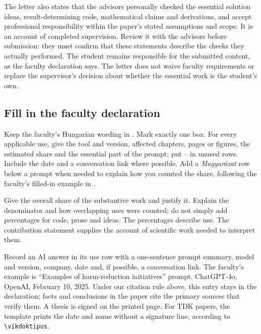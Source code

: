 The letter also states that the advisors personally checked the essential solution ideas, result-determining code, mathematical claims and derivations, and accept professional responsibility within the paper's stated assumptions and scope. It is an account of completed supervision. Review it with the advisors before submission: they must confirm that these statements describe the checks they actually performed. The student remains responsible for the submitted content, as the faculty declaration says. The letter does not waive faculty requirements or replace the supervisor's decision about whether the essential work is the student's own.

\subsection{Fill in the faculty declaration}
Keep the faculty's Hungarian wording in . Mark exactly one box. For every applicable use, give the tool and version, affected chapters, pages or figures, the estimated share and the essential part of the prompt; put -- in unused rows. Include the date and a conversation link where possible. Add a \emph{Magyarázat} row below a prompt when needed to explain how you counted the share, following the faculty's filled-in example in .

Give the overall share of the substantive work and justify it. Explain the denominator and how overlapping uses were counted; do not simply add percentages for code, prose and ideas. The percentages describe use. The contribution statement supplies the account of scientific work needed to interpret them.

Record an AI answer in its use row with a one-sentence prompt summary, model and version, company, date and, if possible, a conversation link. The faculty's example is \enquote{Examples of harm-reduction initiatives} prompt. ChatGPT-4o, OpenAI, February 10, 2025. Under our citation rule above, this entry stays in the declaration; facts and conclusions in the paper cite the primary sources that verify them. A thesis is signed on the printed page. For TDK papers, the template prints the date and name without a signature line, according to \verb|\vikdoktipus|.

